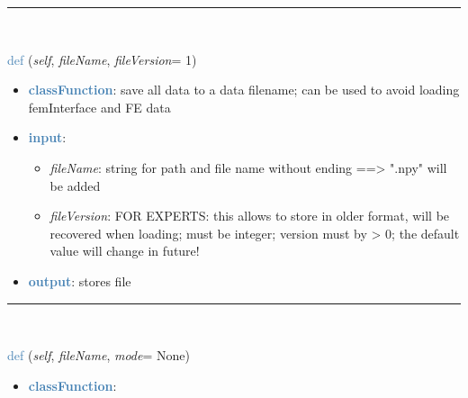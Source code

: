 \begin{itemize}[leftmargin=1.4cm]
\begin{itemize}[leftmargin=1.4cm]
\begin{itemize}[leftmargin=1.4cm]
\begin{itemize}[leftmargin=0.5cm]
\begin{itemize}[leftmargin=1.4cm]
\begin{itemize}[leftmargin=1.4cm]
\begin{itemize}[leftmargin=1.4cm]
\begin{itemize}[leftmargin=0.5cm]
\begin{itemize}[leftmargin=0.7cm]
\begin{itemize}[leftmargin=1.2cm]
\end{itemize}
\vspace{12pt}\end{itemize}
%
\noindent\rule{8cm}{0.75pt}\vspace{1pt} \\ 
\begin{flushleft}
\noindent \textcolor{steelblue}{def {\bf {}}}\label{sec:FEM:ObjectFFRFreducedOrderInterface:SaveToFile}
({\it self}, {\it fileName}, {\it fileVersion}= 1)
\end{flushleft}
\setlength{\itemindent}{0.7cm}
\begin{itemize}[leftmargin=0.7cm]
\item[--]\textcolor{steelblue}{\bf classFunction}: save all data to a data filename; can be used to avoid loading femInterface and FE data
\item[--]\textcolor{steelblue}{\bf input}: \vspace{-6pt}
\begin{itemize}[leftmargin=1.2cm]
\setlength{\itemindent}{-0.7cm}
\item[]{\it fileName}: string for path and file name without ending ==> ".npy" will be added
\item[]{\it fileVersion}: FOR EXPERTS: this allows to store in older format, will be recovered when loading; must be integer; version must by > 0; the default value will change in future!
\end{itemize}
\item[--]\textcolor{steelblue}{\bf output}: stores file
\vspace{12pt}\end{itemize}
%
\noindent\rule{8cm}{0.75pt}\vspace{1pt} \\ 
\begin{flushleft}
\noindent \textcolor{steelblue}{def {\bf {}}}\label{sec:FEM:ObjectFFRFreducedOrderInterface:LoadFromFile}
({\it self}, {\it fileName}, {\it mode}= None)
\end{flushleft}
\setlength{\itemindent}{0.7cm}
\begin{itemize}[leftmargin=0.7cm]
\item[--]\textcolor{steelblue}{\bf classFunction}: \vspace{-6pt}
\begin{itemize}[leftmargin=1.2cm]

\end{itemize}
\end{itemize}
\end{itemize}
\end{itemize}
\end{itemize}
\end{itemize}
\end{itemize}
\end{itemize}
\end{itemize}
\end{itemize}
